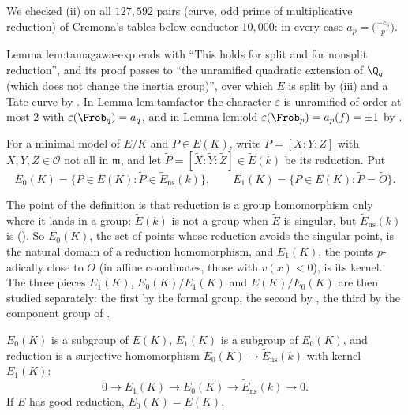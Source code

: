 We checked (ii) on all $127{,}592$ pairs (curve, odd prime of multiplicative reduction) of Cremona's tables below
conductor $10{,}000$: in every case $a_p=\bigl(\frac{-c_6}{p}\bigr)$.

\begin{paperlink}
Lemma lem:tamagawa-exp ends with ``This holds for split and for nonsplit reduction'', and its proof passes to
``the unramified quadratic extension of $\Q_q$ (which does not change the inertia group)'', over which $E$ is
split by (iii) and a Tate curve by . In Lemma
lem:tamfactor the character $\varepsilon$ is unramified of order at most $2$ with $\varepsilon(\Frob_q)=a_q$, and in Lemma
lem:old $\varepsilon(\Frob_p)=a_p(f)=\pm1$ by .
\end{paperlink}

\begin{definition}\label{def:reduction:filtration}
For a minimal model of $E/K$ and $P\in E(K)$, write $P=[X:Y:Z]$ with $X,Y,Z\in\mathcal O$ not all in $\mathfrak m$, and
let $\tilde P=[\tilde X:\tilde Y:\tilde Z]\in\tilde E(k)$ be its reduction. Put
\[
E_0(K)=\{P\in E(K):\tilde P\in\tilde E_{\mathrm{ns}}(k)\},\qquad E_1(K)=\{P\in E(K):\tilde P=\tilde O\}.
\]
\end{definition}

The point of the definition is that reduction is a group homomorphism only where it lands in a group: $\tilde E(k)$ is not a
group when $\tilde E$ is singular, but $\tilde E_{\mathrm{ns}}(k)$ is (). So $E_0(K)$, the set of points whose
reduction avoids the singular point, is the natural domain of a reduction homomorphism, and $E_1(K)$, the points $p$-adically close to $O$ (in affine coordinates, those with
$v(x)<0$), is its kernel. The three pieces $E_1(K)$, $E_0(K)/E_1(K)$ and $E(K)/E_0(K)$ are then studied separately: the first by the
formal group, the second by , the third by the component group of .

\begin{proposition}\label{prop:reduction:filtration}
$E_0(K)$ is a subgroup of $E(K)$, $E_1(K)$ is a subgroup of $E_0(K)$, and reduction is a surjective homomorphism
$E_0(K)\to\tilde E_{\mathrm{ns}}(k)$ with kernel $E_1(K)$:
\[
0\longrightarrow E_1(K)\longrightarrow E_0(K)\longrightarrow\tilde E_{\mathrm{ns}}(k)\longrightarrow0 .
\]
If $E$ has good reduction, $E_0(K)=E(K)$.
\end{proposition}

